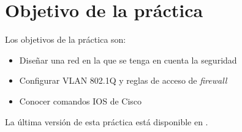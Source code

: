 
\usepackage{eurosym}


\renewcommand{\hmwkClass}{Planificación y Administración de Redes}
\renewcommand{\hmwkTitle}{Práctica VLAN en Cisco}









\primerapagina

\setlength{\parindent}{0em}
\setlength{\parskip}{1em}


\section{Objetivo de la práctica}
Los objetivos de la práctica son:
\begin{itemize}
\item Diseñar una red en la que se tenga en cuenta la seguridad
\item Configurar VLAN 802.1Q y reglas de acceso de \textit{firewall}
\item Conocer comandos IOS de Cisco
\end{itemize}


La última versión de esta práctica está disponible en .


